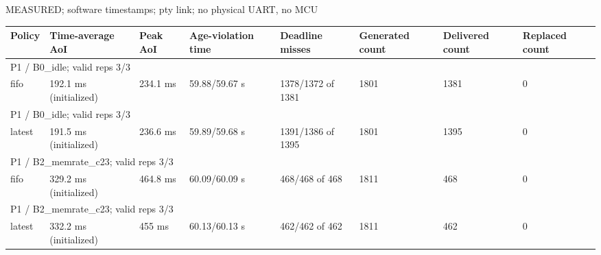 \par\noindent MEASURED; software timestamps; pty link; no physical UART, no MCU\par
\begin{tabular}{llllllll}
\toprule
Policy & Time-average AoI & Peak AoI & Age-violation time & Deadline misses & Generated count & Delivered count & Replaced count \\
\midrule
\multicolumn{8}{l}{P1 / B0\_idle; valid reps 3/3} \\
fifo & 192.1 ms (initialized) & 234.1 ms & 59.88/59.67 s & 1378/1372 of 1381 & 1801 & 1381 & 0 \\
\multicolumn{8}{l}{P1 / B0\_idle; valid reps 3/3} \\
latest & 191.5 ms (initialized) & 236.6 ms & 59.89/59.68 s & 1391/1386 of 1395 & 1801 & 1395 & 0 \\
\multicolumn{8}{l}{P1 / B2\_memrate\_c23; valid reps 3/3} \\
fifo & 329.2 ms (initialized) & 464.8 ms & 60.09/60.09 s & 468/468 of 468 & 1811 & 468 & 0 \\
\multicolumn{8}{l}{P1 / B2\_memrate\_c23; valid reps 3/3} \\
latest & 332.2 ms (initialized) & 455 ms & 60.13/60.13 s & 462/462 of 462 & 1811 & 462 & 0 \\
\bottomrule
\end{tabular}

